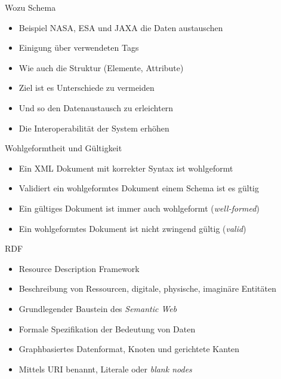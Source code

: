 \documentclass{beamer}
\begin{document}
\begin{frame}{Wozu Schema}
	
	\begin{itemize}
		\item Beispiel NASA, ESA und JAXA die Daten austauschen
		\item Einigung über verwendeten Tags
		\item Wie auch die Struktur (Elemente, Attribute)
		\item Ziel ist es Unterschiede zu vermeiden
		\item Und so den Datenaustausch zu erleichtern
		\item Die Interoperabilität der System erhöhen
	\end{itemize}
	
\end{frame}

\begin{frame}{Wohlgeformtheit und Gültigkeit}
	
	\begin{itemize}
		\item Ein XML Dokument mit korrekter Syntax ist wohlgeformt
		\item Validiert ein wohlgeformtes Dokument einem Schema ist es gültig
		\item Ein gültiges Dokument ist immer auch wohlgeformt (\emph{well-formed})
		\item Ein wohlgeformtes Dokument ist nicht zwingend gültig (\emph{valid})
	\end{itemize}
	
\end{frame}

\begin{frame}{RDF}
	
	\begin{itemize}
		\item Resource Description Framework
		\item Beschreibung von Ressourcen, digitale, physische, imaginäre Entitäten
		\item Grundlegender Baustein des \emph{Semantic Web}
		\item Formale Spezifikation der Bedeutung von Daten
		\item Graphbasiertes Datenformat, Knoten und gerichtete Kanten
		\item Mittels URI benannt, Literale oder \emph{blank nodes}
	\end{itemize}
	
\end{frame}
\end{document}
